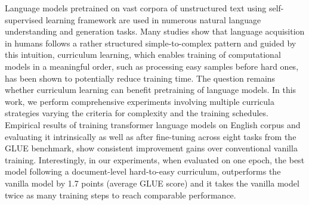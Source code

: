 Language models pretrained on vast corpora of unstructured text using self-supervised learning framework are used in numerous natural language understanding and generation tasks. Many studies show that language acquisition in humans follows a rather structured simple-to-complex pattern and guided by this intuition, curriculum learning, which enables training of computational models in a meaningful order, such as processing easy samples before hard ones, has been shown to potentially reduce training time. The question remains whether curriculum learning can benefit pretraining of language models. In this work, we perform comprehensive experiments involving multiple curricula strategies varying the criteria for complexity and the training schedules. Empirical results of training transformer language models on English corpus and evaluating it intrinsically as well as after fine-tuning across eight tasks from the GLUE benchmark, show consistent improvement gains over conventional vanilla training. Interestingly, in our experiments, when evaluated on one epoch, the best model following a document-level hard-to-easy curriculum, outperforms the vanilla model by 1.7 points (average GLUE score) and it takes the vanilla model twice as many training steps to reach comparable performance.
